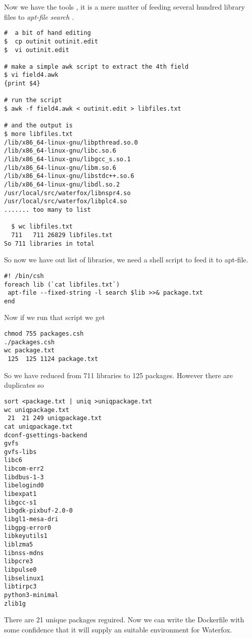 \documentclass[a4paper]{article}  %
\begin{document}
Now we have the tools , it is a mere matter of feeding several hundred library files to {\em apt-file search} . 
\begin{tcolorbox}
\begin{verbatim}
#  a bit of hand editing
$  cp outinit outinit.edit
$  vi outinit.edit

# make a simple awk script to extract the 4th field
$ vi field4.awk
{print $4}

# run the script
$ awk -f field4.awk < outinit.edit > libfiles.txt

# and the output is
$ more libfiles.txt
/lib/x86_64-linux-gnu/libpthread.so.0
/lib/x86_64-linux-gnu/libc.so.6
/lib/x86_64-linux-gnu/libgcc_s.so.1
/lib/x86_64-linux-gnu/libm.so.6
/lib/x86_64-linux-gnu/libstdc++.so.6
/lib/x86_64-linux-gnu/libdl.so.2
/usr/local/src/waterfox/libnspr4.so
/usr/local/src/waterfox/libplc4.so
....... too many to list

  $ wc libfiles.txt
  711   711 26829 libfiles.txt
So 711 libraries in total
\end{verbatim}
\end{tcolorbox}
  So now we have out list of libraries,  we need a shell script to feed it to apt-file.
\begin{lstlisting}
#! /bin/csh
foreach lib (`cat libfiles.txt`)
 apt-file --fixed-string -l search $lib >>& package.txt
end
\end{lstlisting}
Now if we run that script we get
\begin{tcolorbox}
\begin{verbatim}
chmod 755 packages.csh
./packages.csh
wc package.txt
 125  125 1124 package.txt
\end{verbatim}
\end{tcolorbox}
So we have reduced from 711 libraries  to 125 packages. However there are duplicates so
\begin{tcolorbox}
\begin{verbatim}
sort <package.txt | uniq >uniqpackage.txt
wc uniqpackage.txt
 21  21 249 uniqpackage.txt
cat uniqpackage.txt
dconf-gsettings-backend
gvfs
gvfs-libs
libc6
libcom-err2
libdbus-1-3
libelogind0
libexpat1
libgcc-s1
libgdk-pixbuf-2.0-0
libgl1-mesa-dri
libgpg-error0
libkeyutils1
liblzma5
libnss-mdns
libpcre3
libpulse0
libselinux1
libtirpc3
python3-minimal
zlib1g
\end{verbatim}
\end{tcolorbox}
 There are 21 unique packages reguired.
Now we can write the Dockerfile with some confidence that it will supply an suitable environment for Waterfox.
\end{document}
